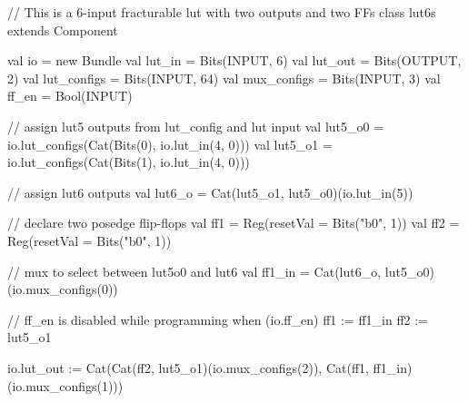 \begin{scala}
// This is a 6-input fracturable lut with two outputs and two FFs                              
class lut6s extends Component {                                                               
  val io = new Bundle {                                                                       
    val lut_in  = Bits(INPUT, 6)                                                              
    val lut_out = Bits(OUTPUT, 2)                                                             
    val lut_configs = Bits(INPUT, 64)                                                         
    val mux_configs = Bits(INPUT, 3)                                                          
    val ff_en = Bool(INPUT)                                                                   
  }                                                                                           
                                                                                              
  // assign lut5 outputs from lut_config and lut input                                        
  val lut5_o0 = io.lut_configs(Cat(Bits(0), io.lut_in(4, 0)))                                 
  val lut5_o1 = io.lut_configs(Cat(Bits(1), io.lut_in(4, 0)))                                 
                                                                                              
  // assign lut6 outputs                                                                      
  val lut6_o = Cat(lut5_o1, lut5_o0)(io.lut_in(5))                                            
                                                                                              
  // declare two posedge flip-flops                                                           
  val ff1 = Reg(resetVal = Bits("b0", 1))                                                     
  val ff2 = Reg(resetVal = Bits("b0", 1))                                                     
                                                                                              
  // mux to select between lut5o0 and lut6                                                    
  val ff1_in = Cat(lut6_o, lut5_o0)(io.mux_configs(0))                                        
                                                                                              
  // ff_en is disabled while programming                                                      
  when (io.ff_en) {                                                                           
    ff1 := ff1_in                                                                             
    ff2 := lut5_o1                                                                            
  }                                                                                           
                                                                                              
  io.lut_out := Cat(Cat(ff2, lut5_o1)(io.mux_configs(2)), Cat(ff1, ff1_in)(io.mux_configs(1)))
}           
\end{scala}

